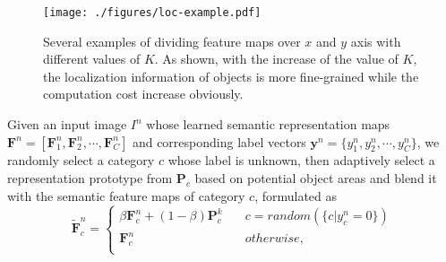 \documentclass[lettersize,journal]{IEEEtran}
\begin{document}
\begin{figure}[!h]
   \centering
   \texttt{[image: ./figures/loc-example.pdf]}
   \caption{Several examples of dividing feature maps over $x$ and $y$ axis with different values of $K$. As shown, with the increase of the value of $K$, the localization information of objects is more fine-grained while the computation cost increase obviously.}
   \label{fig:loc-example}
\end{figure}

Given an input image $I^n$ whose learned semantic representation maps $\textbf{F}^{n}=[\textbf{F}^{n}_1, \textbf{F}^{n}_2, \cdots, \textbf{F}^{n}_C]$ and corresponding label vectors $\textbf{y}^n=\{y^n_1, y^n_2, \cdots, y^n_C\}$, we randomly select a category $c$ whose label is unknown, then adaptively select a representation prototype from $\textbf{P}_{c}$ based on potential object areas and blend it with the semantic feature maps of category $c$, formulated as 
\begin{equation}
 \tilde{\textbf{F}}^{n}_c=
  \begin{cases}
   \beta \textbf{F}^{n}_c + (1-\beta) \textbf{P}^{k}_c \quad & c=random(\{c|y^n_c=0\}) \\
   \textbf{F}^{n}_c \quad & otherwise,\\
  \end{cases}
\end{equation}
\end{document}
